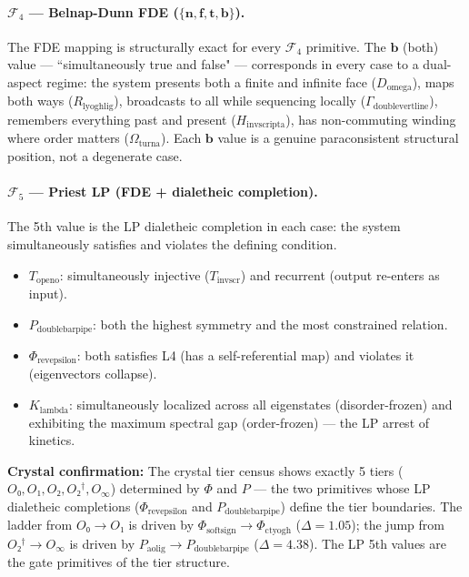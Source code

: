 \documentclass[12pt,a4paper]{article}
\begin{document}
\paragraph{$\mathcal{F}_4$ --- Belnap-Dunn FDE ($\{\mathbf{n}, \mathbf{f}, \mathbf{t}, \mathbf{b}\}$).}
The FDE mapping is structurally exact for every $\mathcal{F}_4$ primitive. The $\mathbf{b}$ (both) value --- ``simultaneously true and false" --- corresponds in every case to a dual-aspect regime: the system presents both a finite and infinite face ($D_{\text{omega}}$), maps both ways ($R_{\text{lyoghlig}}$), broadcasts to all while sequencing locally ($\Gamma_{\text{doublevertline}}$), remembers everything past and present ($H_{\text{invscripta}}$), has non-commuting winding where order matters ($\Omega_{\text{turna}}$). Each $\mathbf{b}$ value is a genuine paraconsistent structural position, not a degenerate case.

\paragraph{$\mathcal{F}_5$ --- Priest LP (FDE + dialetheic completion).}
The 5th value is the LP dialetheic completion in each case: the system simultaneously satisfies and violates the defining condition.
\begin{itemize}
\item $T_{\text{openo}}$: simultaneously injective ($T_{\text{invscr}}$) and recurrent (output re-enters as input).
\item $P_{\text{doublebarpipe}}$: both the highest symmetry and the most constrained relation.
\item $\Phi_{\text{revepsilon}}$: both satisfies L4 (has a self-referential map) and violates it (eigenvectors collapse).
\item $K_{\text{lambda}}$: simultaneously localized across all eigenstates (disorder-frozen) and exhibiting the maximum spectral gap (order-frozen) --- the LP arrest of kinetics.
\end{itemize}

\textbf{Crystal confirmation:} The crystal tier census shows exactly 5 tiers ($O₀, O₁, O₂, O₂^\dagger, O_\infty$) determined by $\Phi$ and $P$ --- the two primitives whose LP dialetheic completions ($\Phi_{\text{revepsilon}}$ and $P_{\text{doublebarpipe}}$) define the tier boundaries. The ladder from $O₀ \to O₁$ is driven by $\Phi_{\text{softsign}} \to \Phi_{\text{ctyogh}}$ ($\Delta = 1.05$); the jump from $O₂^\dagger \to O_\infty$ is driven by $P_{\text{aolig}} \to P_{\text{doublebarpipe}}$ ($\Delta = 4.38$). The LP 5th values are the gate primitives of the tier structure.
\end{document}
